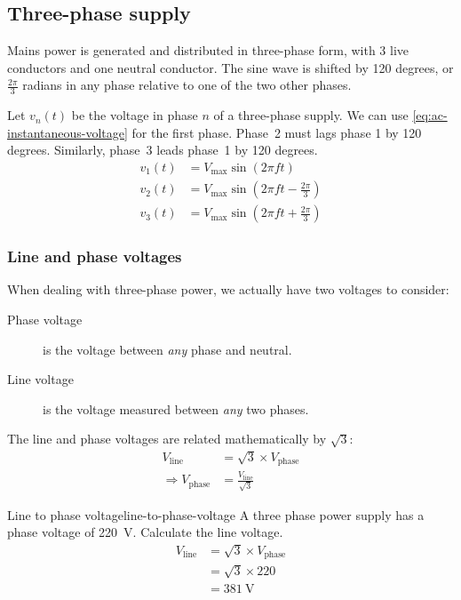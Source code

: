 \documentclass{pgnotes}
\begin{document}
\subsection{Three-phase supply}

Mains power is generated and distributed in three-phase form, with 3 live conductors and one neutral conductor.
The sine wave is shifted by 120 degrees, or $\frac{2\pi}{3}$ radians in any phase relative to one of the two other phases.


Let $v_n(t)$ be the voltage in phase $n$ of a three-phase supply.
We can use \autoref{eq:ac-instantaneous-voltage} for the first phase.
Phase~2 must lags phase 1 by 120 degrees.
Similarly, phase~3 leads phase~1 by 120 degrees.
\begin{align}
  v_1(t) & = V_{\mbox{max}} \sin ( 2 \pi f t ) \\
  v_2(t) & = V_{\mbox{max}} \sin \left ( 2 \pi f t - \frac{2\pi}{3} \right ) \\
  v_3(t) & = V_{\mbox{max}} \sin \left ( 2 \pi f t + \frac{2\pi}{3} \right )                      
\end{align}

\subsubsection{Line and phase voltages}

When dealing with three-phase power, we actually have two voltages to consider:
\begin{description}
\item[Phase voltage] is the voltage between \textit{any} phase and neutral.
\item[Line voltage] is the voltage measured between \textit{any} two phases.
\end{description}

The line and phase voltages are related mathematically by $\sqrt{3}$:
\begin{align}
  V_{\mbox{line}} & = \sqrt{3} \times V_{\mbox{phase}}\\
\Rightarrow  V_{\mbox{phase}} & = \frac{V_{\mbox{line}}}{\sqrt{3}}                     
\end{align}

\begin{example}{Line to phase voltage}{line-to-phase-voltage}
  A three phase power supply has a phase voltage of \SI{220}{\volt}.
  Calculate the line voltage.
  \tcblower
  \begin{align}
    V_{\mbox{line}} & = \sqrt{3} \times V_{\mbox{phase}} \\
                     & = \sqrt{3} \times 220  \\
                     & = \SI{381}{\volt}
  \end{align}
\end{example}
\end{document}
